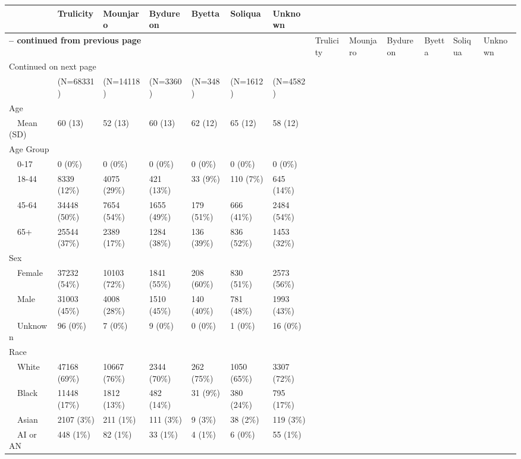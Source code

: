 \begin{longtable}{p{}p{}p{}p{}p{}p{}p{}}
   & Trulicity & Mounjaro & Bydureon & Byetta & Soliqua & Unknown \\ 
  \hline 
\endfirsthead 
\multicolumn{7}{p{\textwidth}}{{ \bfseries \tablename \thetable{} -- continued from previous page}} \ 
\hline Feature & Trulicity & Mounjaro & Bydureon & Byetta & Soliqua & Unknown\\ \hline 
\endhead 
\hline \multicolumn{7}{p{\textwidth}}{{Continued on next page}} \\ \hline 
\endfoot 
\hline 
\endlastfoot 
 \hline
 & (N=68331) & (N=14118) & (N=3360) & (N=348) & (N=1612) & (N=4582) \\ 
  Age &  &  &  &  &  &  \\ 
    Mean (SD) & 60 (13) & 52 (13) & 60 (13) & 62 (12) & 65 (12) & 58 (12) \\ 
  Age Group &  &  &  &  &  &  \\ 
    0-17 & 0 (0\%) & 0 (0\%) & 0 (0\%) & 0 (0\%) & 0 (0\%) & 0 (0\%) \\ 
    18-44 & 8339 (12\%) & 4075 (29\%) & 421 (13\%) & 33 (9\%) & 110 (7\%) & 645 (14\%) \\ 
    45-64 & 34448 (50\%) & 7654 (54\%) & 1655 (49\%) & 179 (51\%) & 666 (41\%) & 2484 (54\%) \\ 
    65+ & 25544 (37\%) & 2389 (17\%) & 1284 (38\%) & 136 (39\%) & 836 (52\%) & 1453 (32\%) \\ 
  Sex &  &  &  &  &  &  \\ 
    Female & 37232 (54\%) & 10103 (72\%) & 1841 (55\%) & 208 (60\%) & 830 (51\%) & 2573 (56\%) \\ 
    Male & 31003 (45\%) & 4008 (28\%) & 1510 (45\%) & 140 (40\%) & 781 (48\%) & 1993 (43\%) \\ 
    Unknown & 96 (0\%) & 7 (0\%) & 9 (0\%) & 0 (0\%) & 1 (0\%) & 16 (0\%) \\ 
  Race &  &  &  &  &  &  \\ 
    White & 47168 (69\%) & 10667 (76\%) & 2344 (70\%) & 262 (75\%) & 1050 (65\%) & 3307 (72\%) \\ 
    Black & 11448 (17\%) & 1812 (13\%) & 482 (14\%) & 31 (9\%) & 380 (24\%) & 795 (17\%) \\ 
    Asian & 2107 (3\%) & 211 (1\%) & 111 (3\%) & 9 (3\%) & 38 (2\%) & 119 (3\%) \\ 
    AI or AN & 448 (1\%) & 82 (1\%) & 33 (1\%) & 4 (1\%) & 6 (0\%) & 55 (1\%) \\ 

\end{longtable}
